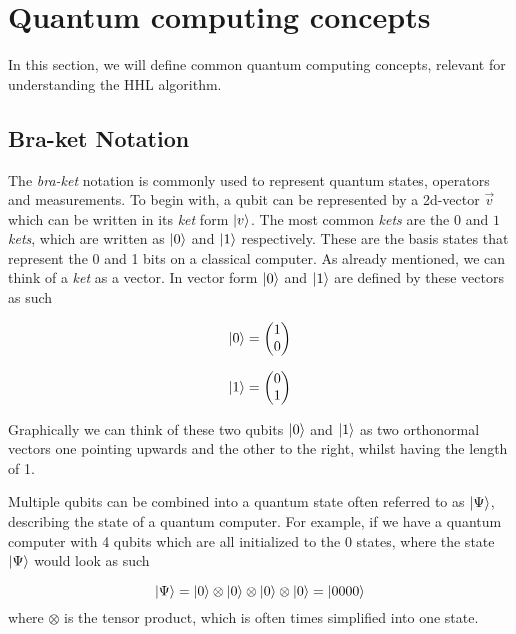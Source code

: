 \section{Quantum computing concepts}
In this section, we will define common quantum computing concepts, relevant for understanding the HHL algorithm.

\subsection{Bra-ket Notation}
The \textit{bra-ket} notation is commonly used to represent quantum states, operators and measurements.
To begin with, a qubit can be represented by a 2d-vector $\vec v$ which can be written in its \textit{ket} form $\ket v$.
The most common \textit{kets} are the $0$ and $1$ \textit{kets}, which are written as $\ket 0$ and $\ket 1$ respectively.
These are the basis states that represent the 0 and 1 bits on a classical computer. 
As already mentioned, we can think of a \textit{ket} as a vector. 
In vector form $\ket 0$ and $\ket 1$ are defined by these vectors as such

\begin{equation}
  \ket 0  = \begin{pmatrix}1\\0\end{pmatrix} 
\end{equation}

\begin{equation}
  \ket 1  = \begin{pmatrix}0\\1\end{pmatrix}
\end{equation}

Graphically we can think of these two qubits $\ket 0$ and $\ket 1$ as two orthonormal vectors one pointing upwards and the other to the right, whilst having the length of 1.

Multiple qubits can be combined into a quantum state often referred to as $\ket \Psi$, describing the state of a quantum computer. 
For example, if we have a quantum computer with 4 qubits which are all initialized to the 0 states, where the state $\ket \Psi$ would look as such

\begin{equation}
    \ket \Psi = \ket 0 \otimes \ket 0 \otimes \ket 0 \otimes \ket 0 = \ket{0000}
\end{equation}
where $\otimes$ is the tensor product, which is often times simplified into one state.

